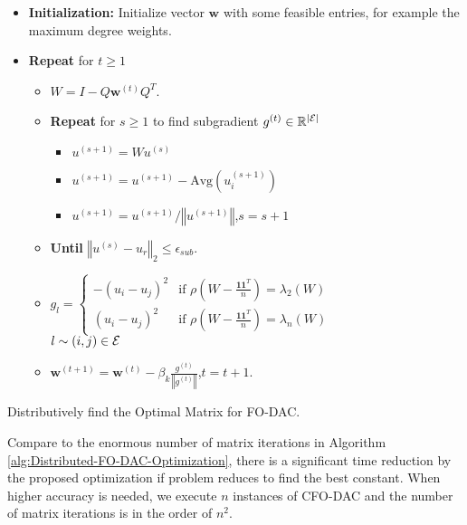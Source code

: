 \begin{algorithm}
\begin{itemize}
\item \textbf{Initialization: }Initialize vector $\mathbf{w}$ with some
feasible entries, for example the maximum degree weights. 
\item \textbf{Repeat} for $t\geq1$

\begin{itemize}
\item $W=I-Q\mathbf{w}^{\left(t\right)}Q^{T}$. 
\item \textbf{Repeat }for\textbf{ $s\geq1$ }to find subgradient $g^{\left(t\right)}\in\mathbb{R}^{\left|{\cal E}\right|}$

\begin{itemize}
\item $u^{\left(s+1\right)}=Wu^{\left(s\right)}$
\item $u^{\left(s+1\right)}=u^{\left(s+1\right)}-\mbox{Avg}\left(u_{i}^{\left(s+1\right)}\right)$
\item $u^{\left(s+1\right)}=u^{\left(s+1\right)}/\left\Vert u^{\left(s+1\right)}\right\Vert $,$s=s+1$
\end{itemize}
\item \textbf{Until } \textbf{$\left\Vert u^{\left(s\right)}-u_{r}\right\Vert _{2}\leq\epsilon_{sub}$}. 
\item $g_{l}=\begin{cases}
-\left(u_{i}-u_{j}\right)^{2} & \mbox{if }\rho\left(W-\frac{\mathbf{11}^{T}}{n}\right)=\lambda_{2}\left(W\right)\\
\left(u_{i}-u_{j}\right)^{2} & \mbox{if }\rho\left(W-\frac{\mathbf{11}^{T}}{n}\right)=\lambda_{n}\left(W\right)
\end{cases}$\\
$l\sim\left(i,j\right)\in{\cal E}$
\item $\mathbf{w}^{\left(t+1\right)}=\mathbf{w}^{\left(t\right)}-\beta_{k}\frac{g^{\left(t\right)}}{\left\Vert g^{\left(t\right)}\right\Vert }$,$t=t+1$.
\end{itemize}
\end{itemize}
\caption{\label{alg:Distributed-FO-DAC-Optimization}Distributively find the
Optimal Matrix for FO-DAC.}
\end{algorithm}


Compare to the enormous number of matrix iterations in Algorithm \ref{alg:Distributed-FO-DAC-Optimization},
there is a significant time reduction by the proposed optimization
if problem  reduces to find the
best constant. When higher accuracy is needed, we execute $n$ instances
of CFO-DAC and the number of matrix iterations is in the order of
$n^{2}$. 



